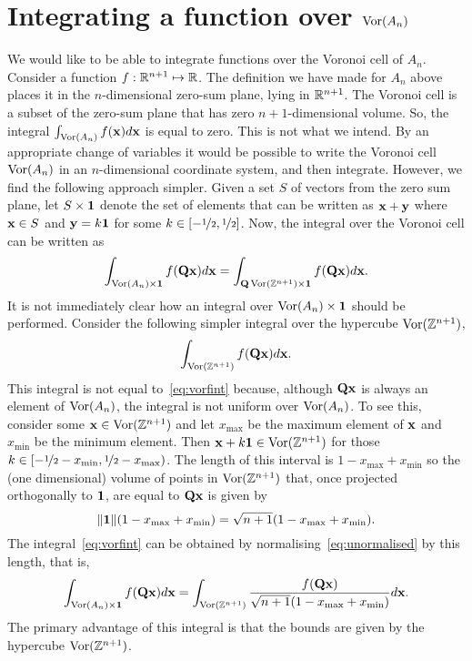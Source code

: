 \documentclass[draftcls, onecolumn, 11pt]{IEEEtran}
\begin{document}
\section{Integrating a function over $\operatorname{Vor}(A_n)$}\label{sec:integr-funct-over}

We would like to be able to integrate functions over the Voronoi cell of $A_n$.  Consider a function $f : {\mathbb R}^{n+1} \mapsto {\mathbb R}$.  The definition we have made for $A_n$ above places it in the $n$-dimensional zero-sum plane, lying in ${\mathbb R}^{n+1}$.  The Voronoi cell is a subset of the zero-sum plane that has zero $n+1$-dimensional volume.  So, the integral $\int_{\operatorname{Vor}(A_n)} f(\mathbf{x}) d \mathbf{x}$ is equal to zero.  This is not what we intend.  By an appropriate change of variables it would be possible to write the Voronoi cell $\operatorname{Vor}(A_n)$ in an $n$-dimensional coordinate system, and then integrate.  However, we find the following approach simpler.  Given a set $S$ of vectors from the zero sum plane, let $S \times \boldsymbol{1}$ denote the set of elements that can be written as $\mathbf{x} + \mathbf{y}$ where $\mathbf{x} \in S$ and $\mathbf{y} = k\boldsymbol{1}$ for some $k \in [-\nicefrac{1}{2},\nicefrac{1}{2}]$.  Now, the integral over the Voronoi cell can be written as
\begin{equation}\label{eq:vorfint}
\int_{\vor(A_n) \times \onebf} f(\Qbf\xbf) d\xbf = \int_{\Qbf\vor(\ints^{n+1}) \times \onebf} f(\Qbf\xbf) d\xbf.
\end{equation}
It is not immediately clear how an integral over $\operatorname{Vor}(A_n) \times \boldsymbol{1}$ should be performed.  Consider the following simpler integral over the hypercube $\operatorname{Vor}({\mathbb Z}^{n+1})$,
\begin{equation}\label{eq:unormalised}
\int_{\vor(\ints^{n+1})} f(\Qbf\xbf) d\xbf.
\end{equation}
This integral is not equal to~\eqref{eq:vorfint} because, although $\mathbf{Q}\mathbf{x}$ is always an element of $\operatorname{Vor}(A_n)$, the integral is not uniform over $\operatorname{Vor}(A_n)$.  To see this, consider some $\mathbf{x} \in \operatorname{Vor}({\mathbb Z}^{n+1})$ and let $x_{\text{max}}$ be the maximum element of $\mathbf{x}$ and $x_{\text{min}}$ be the minimum element.  Then $\mathbf{x} +  k \boldsymbol{1} \in \operatorname{Vor}({\mathbb Z}^{n+1})$ for those $k \in [-\nicefrac{1}{2} - x_{\text{min}}, \nicefrac{1}{2} - x_{\text{max}})$.  The length of this interval is $1 - x_{\text{max}} + x_{\text{min}}$ so the (one dimensional) volume of points in $\operatorname{Vor}({\mathbb Z}^{n+1})$ that, once projected orthogonally to $\boldsymbol{1}$, are equal to $\mathbf{Q}\mathbf{x}$ is given by
\[
\|\boldsymbol{1}\|(1 - x_{\text{max}} + x_{\text{min}}) = \sqrt{n+1}(1 - x_{\text{max}} + x_{\text{min}}).
\]
The integral~\eqref{eq:vorfint} can be obtained by normalising~\eqref{eq:unormalised} by this length, that is,
\[
\int_{\operatorname{Vor}(A_n) \times \boldsymbol{1}} f(\mathbf{Q}\mathbf{x}) d\mathbf{x} =  \int_{\operatorname{Vor}({\mathbb Z}^{n+1})} \frac{f(\mathbf{Q}\mathbf{x})}{\sqrt{n+1}(1 - x_{\text{max}} + x_{\text{min}})}  d\mathbf{x}.
\]
The primary advantage of this integral is that the bounds are given by the hypercube $\operatorname{Vor}({\mathbb Z}^{n+1})$.
\end{document}
